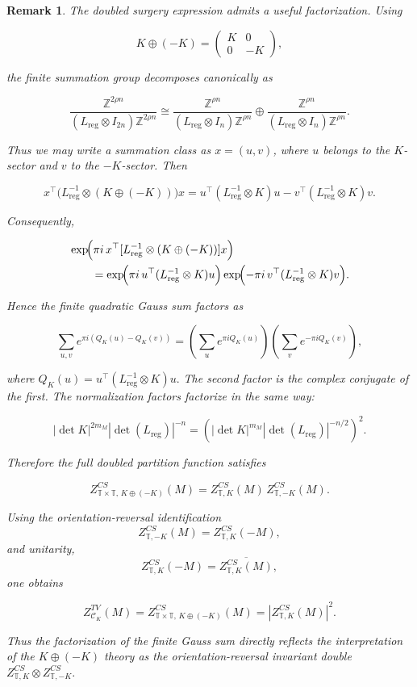 \documentclass[12pt]{amsart}
\numberwithin{equation}{section}
\newtheorem*{remark}{Remark}
\theoremstyle{definition}
\begin{document}
\begin{remark}
The doubled surgery expression admits a useful factorization. Using

$$
K\oplus(-K)
=
\begin{pmatrix}
K&0\\
0&-K
\end{pmatrix},
$$

the finite summation group decomposes canonically as

$$
\frac{\mathbb Z^{2\rho n}}
     {(L_{\mathrm{reg}}\otimes I_{2n})\mathbb Z^{2\rho n}}
\cong
\frac{\mathbb Z^{\rho n}}
     {(L_{\mathrm{reg}}\otimes I_n)\mathbb Z^{\rho n}}
\oplus
\frac{\mathbb Z^{\rho n}}
     {(L_{\mathrm{reg}}\otimes I_n)\mathbb Z^{\rho n}}.
$$

Thus we may write a summation class as $x=(u,v)$, where $u$ belongs to the $K$-sector and $v$ to the $-K$-sector. Then

$$
x^\top
\bigl(
L_{\mathrm{reg}}^{-1}\otimes(K\oplus(-K))
\bigr)x
=
u^\top(L_{\mathrm{reg}}^{-1}\otimes K)u
-
v^\top(L_{\mathrm{reg}}^{-1}\otimes K)v.
$$

Consequently,

$$
\begin{aligned}
&\exp\!\Bigl(
\pi i\,x^\top
[L_{\mathrm{reg}}^{-1}\otimes(K\oplus(-K))]x
\Bigr)
\\
&\qquad =
\exp\!\Bigl(
\pi i\,u^\top(L_{\mathrm{reg}}^{-1}\otimes K)u
\Bigr)
\exp\!\Bigl(
-\pi i\,v^\top(L_{\mathrm{reg}}^{-1}\otimes K)v
\Bigr).
\end{aligned}
$$

Hence the finite quadratic Gauss sum factors as

$$
\sum_{u,v}
e^{\pi i(Q_K(u)-Q_K(v))}
=
\left(
\sum_u e^{\pi iQ_K(u)}
\right)
\left(
\sum_v e^{-\pi iQ_K(v)}
\right),
$$

where $Q_K(u)=u^\top(L_{\mathrm{reg}}^{-1}\otimes K)u.$ The second factor is the complex conjugate of the first. The normalization factors factorize in the same way:

$$
|\det K|^{2m_M}
|\det(L_{\mathrm{reg}})|^{-n}
=
\left(
|\det K|^{m_M}
|\det(L_{\mathrm{reg}})|^{-n/2}
\right)^2.
$$

Therefore the full doubled partition function satisfies

$$
Z^{CS}_{\mathbb T\times\mathbb T,\,K\oplus(-K)}(M)
=
Z^{CS}_{\mathbb T,K}(M)\,
Z^{CS}_{\mathbb T,-K}(M).
$$

Using the orientation-reversal identification
$$
Z^{CS}_{\mathbb T,-K}(M)
=
Z^{CS}_{\mathbb T,K}(-M),
$$
and unitarity,
$$
Z^{CS}_{\mathbb T,K}(-M)
=
\overline{Z^{CS}_{\mathbb T,K}(M)},
$$
one obtains

$$
Z^{TV}_{\mathcal C_K}(M)=Z^{CS}_{\mathbb T\times\mathbb T,\,K\oplus(-K)}(M)
=
\left|Z^{CS}_{\mathbb T,K}(M)\right|^2.
$$

Thus the factorization of the finite Gauss sum directly reflects the interpretation of the $K\oplus(-K)$ theory as the orientation-reversal invariant double $Z^{CS}_{\mathbb T,K}\otimes Z^{CS}_{\mathbb T,-K}.$
\end{remark}
\end{document}
